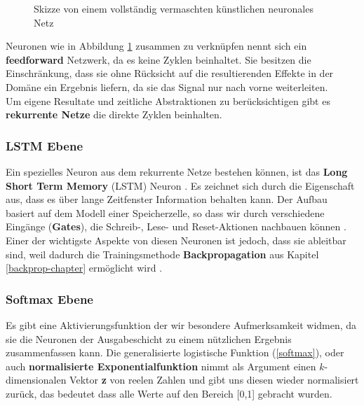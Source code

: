 \begin{figure}[H]
                \caption{Skizze von einem vollständig vermaschten künstlichen neuronales Netz \label{fig:nntikz}}
            \end{figure}
            \noindent
            Neuronen wie in Abbildung \ref{fig:nntikz} zusammen zu verknüpfen nennt sich ein \textbf{feedforward} Netzwerk, da es keine Zyklen beinhaltet. Sie besitzen die Einschränkung, dass sie ohne Rücksicht auf die resultierenden Effekte in der Domäne ein Ergebnis liefern, da sie das Signal nur nach vorne weiterleiten.\\

            \noindent
            Um eigene Resultate und zeitliche Abstraktionen zu berücksichtigen gibt es \textbf{rekurrente Netze} die direkte Zyklen beinhalten.

            \subsubsection*{LSTM Ebene} \label{lstm-definition}
                Ein spezielles Neuron aus dem rekurrente Netze bestehen können, ist das \textbf{Long Short Term Memory} (LSTM) Neuron \cite{lstm}. Es zeichnet sich durch die Eigenschaft aus, dass es über lange Zeitfenster Information behalten kann. Der Aufbau basiert auf dem Modell einer Speicherzelle, so dass wir durch verschiedene Eingänge (\textbf{Gates}), die Schreib-, Lese- und Reset-Aktionen nachbauen können \cite{lstm-new}. Einer der wichtigste Aspekte von diesen Neuronen ist jedoch, dass sie ableitbar sind, weil dadurch die Trainingsmethode \textbf{Backpropagation} aus Kapitel \ref{backprop-chapter} ermöglicht wird \cite{backprop}.

            \subsubsection*{Softmax Ebene} \label{softmax-definition}
                Es gibt eine Aktivierungsfunktion der wir besondere Aufmerksamkeit widmen, da sie die Neuronen der Ausgabeschicht zu einem nützlichen Ergebnis zusammenfassen kann. Die generalisierte logistische Funktion (\ref{softmax}), oder auch \textbf{normalisierte Exponentialfunktion} nimmt als Argument einen $k$-dimensionalen Vektor \textbf{z} von reelen Zahlen und gibt uns diesen wieder normalisiert zurück, das bedeutet dass alle Werte auf den Bereich [0,1] gebracht wurden.

